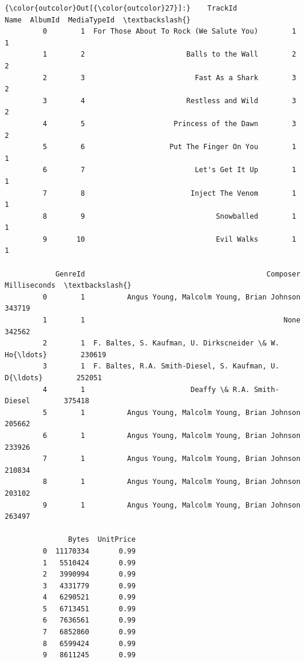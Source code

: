 \documentclass[11pt]{article}
\begin{document}
\begin{Verbatim}[commandchars=\\\{\}]
{\color{outcolor}Out[{\color{outcolor}27}]:}    TrackId                                     Name  AlbumId  MediaTypeId  \textbackslash{}
         0        1  For Those About To Rock (We Salute You)        1            1   
         1        2                        Balls to the Wall        2            2   
         2        3                          Fast As a Shark        3            2   
         3        4                        Restless and Wild        3            2   
         4        5                     Princess of the Dawn        3            2   
         5        6                    Put The Finger On You        1            1   
         6        7                          Let's Get It Up        1            1   
         7        8                         Inject The Venom        1            1   
         8        9                               Snowballed        1            1   
         9       10                               Evil Walks        1            1   
         
            GenreId                                           Composer  Milliseconds  \textbackslash{}
         0        1          Angus Young, Malcolm Young, Brian Johnson        343719   
         1        1                                               None        342562   
         2        1  F. Baltes, S. Kaufman, U. Dirkscneider \& W. Ho{\ldots}        230619   
         3        1  F. Baltes, R.A. Smith-Diesel, S. Kaufman, U. D{\ldots}        252051   
         4        1                         Deaffy \& R.A. Smith-Diesel        375418   
         5        1          Angus Young, Malcolm Young, Brian Johnson        205662   
         6        1          Angus Young, Malcolm Young, Brian Johnson        233926   
         7        1          Angus Young, Malcolm Young, Brian Johnson        210834   
         8        1          Angus Young, Malcolm Young, Brian Johnson        203102   
         9        1          Angus Young, Malcolm Young, Brian Johnson        263497   
         
               Bytes  UnitPrice  
         0  11170334       0.99  
         1   5510424       0.99  
         2   3990994       0.99  
         3   4331779       0.99  
         4   6290521       0.99  
         5   6713451       0.99  
         6   7636561       0.99  
         7   6852860       0.99  
         8   6599424       0.99  
         9   8611245       0.99  
\end{Verbatim}
            
\end{document}
